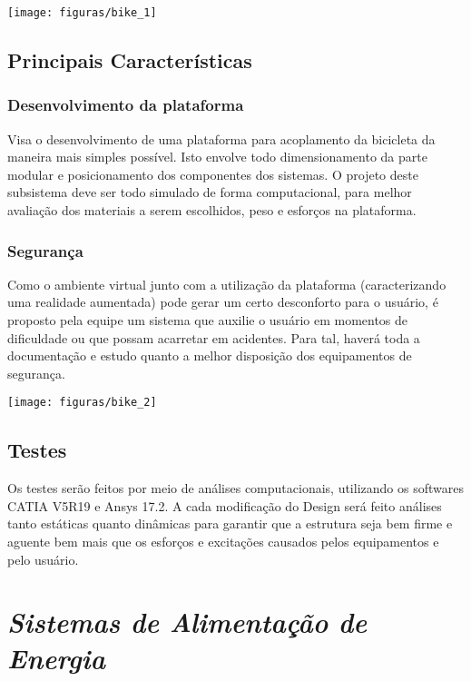\begin{center}
\texttt{[image: figuras/bike\_1]}
\end{center}

\subsection{Principais Características}
\subsubsection{Desenvolvimento da plataforma}
Visa o desenvolvimento de uma plataforma para acoplamento da bicicleta da maneira mais simples possível. Isto envolve todo dimensionamento da parte modular e posicionamento dos componentes dos sistemas. O projeto deste subsistema deve ser todo simulado de forma computacional, para melhor avaliação dos materiais a serem escolhidos, peso e esforços na plataforma.

\subsubsection{Segurança}
Como o ambiente virtual junto com a utilização da plataforma (caracterizando uma realidade aumentada) pode gerar um certo desconforto para o usuário, é proposto pela equipe um sistema que auxilie o usuário em momentos de dificuldade ou que possam acarretar em acidentes. Para tal, haverá toda a documentação e estudo quanto a melhor disposição dos equipamentos de segurança.

\begin{center}
	\texttt{[image: figuras/bike\_2]}
\end{center}

\subsection{Testes}
Os testes serão feitos por meio de análises computacionais, utilizando os softwares CATIA V5R19 e Ansys 17.2. A cada modificação do Design será feito análises tanto estáticas quanto dinâmicas para garantir que a estrutura seja bem firme e aguente bem mais que os esforços e excitações causados pelos equipamentos e pelo usuário.

\section{\textit{Sistemas de Alimentação de Energia }}
